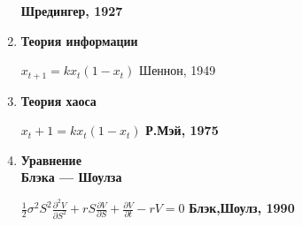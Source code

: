 \documentclass[12pt]{article}
\begin{document}
\begin{enumerate}
\begin{minipage}[t]{100mm}
			\hfill \bf{Шредингер, 1927} \end{minipage}
		\item \bf{Теория информации} \hfill
		\begin{minipage}[t]{100mm}$ x_{t+1}=kx_{t}(1-x_{t}) $ \hfill Шеннон, 1949
		\end{minipage}
		\item \bf{Теория хаоса}  \hfill \begin{minipage}[t]{100mm} $x_t+1 = kx_t(1-x_t)$  \hfill \bf{Р.Мэй, 1975} \end{minipage}
		\item \begin{minipage}[t]{45mm} \bf{Уравнение \\Блэка — Шоулза\\} \end{minipage}
		\hfill 
		\begin{minipage}[t]{100mm}  $ \frac{1}{2} \sigma^2 S^2 \frac{\partial^2 V}{\partial S^2} + rS \frac{\partial V}{\partial S} + \frac{\partial V}{\partial t} - rV = 0$ \hfill \bf{Блэк,Шоулз, 1990} \end{minipage}
	\end{enumerate}
\end{document}
